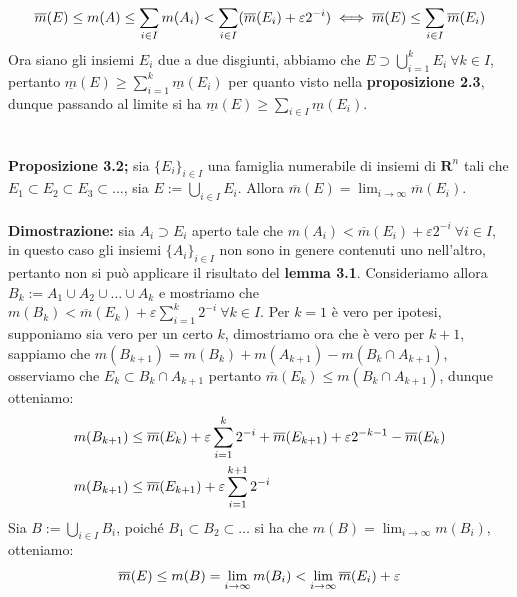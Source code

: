 \documentclass{article}
\begin{document}
\begin{equation}
    \overline{m}(E) \leq m(A) \leq \sum_{i \in I} m(A_i) < \sum_{i \in I} (\overline{m}(E_i) + \varepsilon2^{-i}) \iff \overline{m}(E) \leq \sum_{i \in I} \overline{m}(E_i) \notag
\end{equation}
Ora siano gli insiemi $E_i$ due a due disgiunti, abbiamo che $E \supset \bigcup_{i = 1}^k E_i \ \forall k \in I$, pertanto $\underline{m}(E) \geq \sum_{i = 1}^k \underline{m}(E_i)$ per quanto visto nella \textbf{proposizione 2.3}, dunque passando al limite si ha $\underline{m}(E) \geq \sum_{i \in I} \underline{m}(E_i)$. \\ \\ \\
\textbf{Proposizione 3.2;} sia $\{ E_i \}_{i \in I}$ una famiglia numerabile di insiemi di $\mathbf{R}^n$ tali che $E_1 \subset E_2 \subset E_3 \subset \dots$, sia $E := \bigcup_{i \in I} E_i$. Allora $\overline{m}(E) = \lim_{i \rightarrow \infty} \overline{m}(E_i)$. \\ \\
\textbf{Dimostrazione:} sia $A_i \supset E_i$ aperto tale che $m(A_i) < \overline{m}(E_i) + \varepsilon2^{-i} \ \forall i \in I$, in questo caso gli insiemi $\{ A_i \}_{i \in I}$ non sono in genere contenuti uno nell'altro, pertanto non si può applicare il risultato del \textbf{lemma 3.1}. Consideriamo allora $B_k := A_1 \cup A_2 \cup \dots \cup A_k$ e mostriamo che $m(B_k) < \overline{m}(E_k) + \varepsilon \sum_{i = 1}^k 2^{-i} \ \forall k \in I$. Per $k = 1$ è vero per ipotesi, supponiamo sia vero per un certo $k$, dimostriamo ora che è vero per $k + 1$, sappiamo che $m(B_{k + 1}) = m(B_k) + m(A_{k + 1}) - m(B_k \cap A_{k + 1})$, osserviamo che $E_k \subset B_k \cap A_{k + 1}$ pertanto $\overline{m}(E_k) \leq m(B_k \cap A_{k + 1})$, dunque otteniamo:
\begin{align}
    m(B_{k + 1}) &\leq \overline{m}(E_k) + \varepsilon \sum_{i = 1}^k 2^{-i} + \overline{m}(E_{k + 1}) + \varepsilon2^{-k - 1} - \overline{m}(E_k) \notag \\
    m(B_{k + 1}) &\leq \overline{m}(E_{k + 1}) + \varepsilon \sum_{i = 1}^{k + 1} 2^{-i} \notag
\end{align}
Sia $B := \bigcup_{i \in I} B_i$, poiché $B_1 \subset B_2 \subset \dots$ si ha che $m(B) = \lim_{i \rightarrow \infty} m(B_i)$, otteniamo:
\begin{align}
    \overline{m}(E) \leq m(B) = \lim_{i \rightarrow \infty} m(B_i) < \lim_{i \rightarrow \infty} \overline{m}(E_i) + \varepsilon \notag
\end{align}
\end{document}
